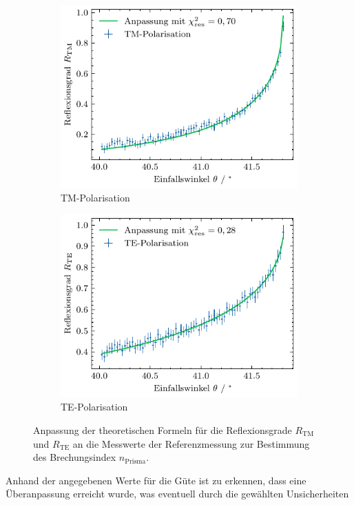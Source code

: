 \begin{figure}[H]
    \centering
    \begin{subfigure}{0.45\textwidth}
        \centering
        \includegraphics[width=\linewidth]{../figs/glas_ppol_fit}
        \caption{TM-Polarisation}
    \end{subfigure}
    \begin{subfigure}{0.45\textwidth}
        \centering
        \includegraphics[width=\linewidth]{../figs/glas_spol_fit}
        \caption{TE-Polarisation}
    \end{subfigure}
    \caption{Anpassung der theoretischen Formeln für die Reflexionsgrade $R_{\mathrm{TM}}$ und $R_{\mathrm{TE}}$ an die Messwerte der Referenzmessung
    zur Bestimmung des Brechungsindex $n_{\mathrm{Prisma}}$.}\label{fig:glas_fit}
\end{figure} Anhand der angegebenen Werte für die Güte ist zu erkennen, dass eine Überanpassung erreicht wurde, was eventuell durch die gewählten Unsicherheiten
